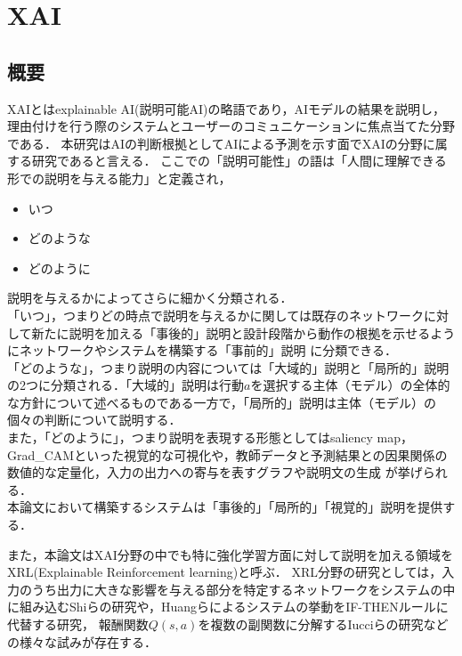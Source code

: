 \section{XAI}

\subsection{概要}
XAIとはexplainable AI(説明可能AI)の略語であり，AIモデルの結果を説明し，理由付けを行う際のシステムとユーザーのコミュニケーションに焦点当てた分野である\cite{consider}．
本研究はAIの判断根拠としてAIによる予測を示す面でXAIの分野に属する研究であると言える．
ここでの「説明可能性」の語は「人間に理解できる形での説明を与える能力」\cite{definition}と定義され，
\begin{itemize}
    \item いつ
    \item どのような
    \item どのように
\end{itemize}
説明を与えるかによってさらに細かく分類される．\\
「いつ」，つまりどの時点で説明を与えるかに関しては既存のネットワークに対して新たに説明を加える「事後的」説明と設計段階から動作の根拠を示せるようにネットワークやシステムを構築する「事前的」説明
に分類できる\cite{definition}．\\
「どのような」，つまり説明の内容については「大域的」説明と「局所的」説明の2つに分類される．「大域的」説明は行動$a$を選択する主体（モデル）の全体的な方針について述べるものである一方で，「局所的」説明は主体（モデル）の個々の判断について説明する\cite{gl}．\\
また，「どのように」，つまり説明を表現する形態としてはsaliency map\cite{saliency}， Grad\_CAM\cite{Grad-CAM}といった視覚的な可視化や，教師データと予測結果との因果関係の数値的な定量化\cite{定量}，入力の出力への寄与を表すグラフや説明文の生成\cite{LIME}
が挙げられる．\\
本論文において構築するシステムは「事後的」「局所的」「視覚的」説明を提供する．

また，本論文はXAI分野の中でも特に強化学習方面に対して説明を加える領域をXRL(Explainable Reinforcement learning)と呼ぶ\cite{XRL}．
XRL分野の研究としては，入力のうち出力に大きな影響を与える部分を特定するネットワークをシステムの中に組み込むShiらの研究\cite{DBLP:journals/corr/abs-2003-07069}や，Huangらによるシステムの挙動をIF-THENルールに代替する研究\cite{Huang2020InterpretablePF}， 報酬関数$Q(s, a)$を複数の副関数に分解するIucciらの研究\cite{9659472}などの様々な試みが存在する．



